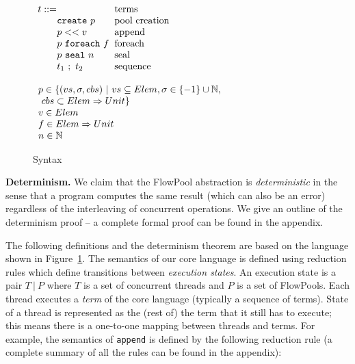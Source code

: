 \documentclass[runningheads,a4paper]{llncs}
\newcommand{\gap}{\quad\quad}
\newcommand{\set}[1]{\{#1\}}
\newcommand{\ba}{\begin{array}}
\newcommand{\ea}{\end{array}}
\begin{document}
\begin{figure}[t]


\begin{minipage}[b]{5 cm}
$\ba[t]{l@{\hspace{2mm}}l}
t    ::=                                                           & \mbox{terms}              \\
\gap \texttt{create}~p                                   & \mbox{pool creation}  \\
\gap p << v                                                  & \mbox{append}           \\
\gap p~\texttt{foreach}~f                             & \mbox{foreach}           \\
\gap p~\texttt{seal}~n                                  & \mbox{seal}                \\
\gap t_1~;~t_2                                               & \mbox{sequence}        \\
\ea$
\end{minipage}
\begin{minipage}[b]{7 cm}
$\ba[t]{l@{\hspace{2mm}}l}
p \in \set{(vs, \sigma, cbs)~|~vs \subseteq Elem, \sigma \in \set{-1} \cup \mathbb{N}, \\
\text{ } cbs \subset Elem \Rightarrow Unit} \\
v \in Elem \\
f \in Elem \Rightarrow Unit \\
n \in \mathbb{N}
\ea$
\end{minipage}


\caption{Syntax}\label{fig:syntax}
\end{figure}

\textbf{Determinism.}
We claim that the FlowPool abstraction is
\emph{deterministic} in the sense that a program computes the same
result (which can also be an error) regardless of the interleaving of
concurrent operations. We give an outline of the determinism
proof -- a complete formal proof can be found in the appendix.

The following definitions and the determinism theorem are based on the
language shown in Figure~\ref{fig:syntax}. The semantics of our core
language is defined using reduction rules which define transitions
between \emph{execution states}. An execution state is a pair $T~|~P$
where $T$ is a set of concurrent threads and $P$ is a set of
FlowPools. Each thread executes a \emph{term} of the core language
(typically a sequence of terms).
State of a thread is represented as the (rest of)
the term that it still has to execute; this means there is a
one-to-one mapping between threads and terms.
For example, the semantics of \verb|append| is defined by the
following reduction rule (a complete summary of all the rules can be
found in the appendix):
\end{document}
